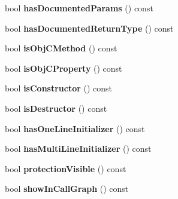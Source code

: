 \begin{DoxyCompactItemize}
\item 
\hypertarget{class_member_def_a19486dbf4843b02193f7c027107d0526}{bool {\bfseries has\-Documented\-Params} () const }\label{class_member_def_a19486dbf4843b02193f7c027107d0526}

\item 
\hypertarget{class_member_def_aac5265e89cb172f5c65404481bbf8eb6}{bool {\bfseries has\-Documented\-Return\-Type} () const }\label{class_member_def_aac5265e89cb172f5c65404481bbf8eb6}

\item 
\hypertarget{class_member_def_a17cdfebf29c3d08353e41aa701611490}{bool {\bfseries is\-Obj\-C\-Method} () const }\label{class_member_def_a17cdfebf29c3d08353e41aa701611490}

\item 
\hypertarget{class_member_def_a19bd1538e8499a467e7538a4defd4c05}{bool {\bfseries is\-Obj\-C\-Property} () const }\label{class_member_def_a19bd1538e8499a467e7538a4defd4c05}

\item 
\hypertarget{class_member_def_a4ec8e77add4ce0a4994a0993699b01d7}{bool {\bfseries is\-Constructor} () const }\label{class_member_def_a4ec8e77add4ce0a4994a0993699b01d7}

\item 
\hypertarget{class_member_def_ac375a1091c1191ddacd3931ee7c19a05}{bool {\bfseries is\-Destructor} () const }\label{class_member_def_ac375a1091c1191ddacd3931ee7c19a05}

\item 
\hypertarget{class_member_def_aca09b933ed4b1e2592d28cb156053b86}{bool {\bfseries has\-One\-Line\-Initializer} () const }\label{class_member_def_aca09b933ed4b1e2592d28cb156053b86}

\item 
\hypertarget{class_member_def_a7c5f28c289e2a6ba84dbec765e462345}{bool {\bfseries has\-Multi\-Line\-Initializer} () const }\label{class_member_def_a7c5f28c289e2a6ba84dbec765e462345}

\item 
\hypertarget{class_member_def_a00e0153113da065bcaed837f6098d7ac}{bool {\bfseries protection\-Visible} () const }\label{class_member_def_a00e0153113da065bcaed837f6098d7ac}

\item 
\hypertarget{class_member_def_ae74f5d38d99f585b2c6624b7e08ceff3}{bool {\bfseries show\-In\-Call\-Graph} () const }\label{class_member_def_ae74f5d38d99f585b2c6624b7e08ceff3}


\end{DoxyCompactItemize}
